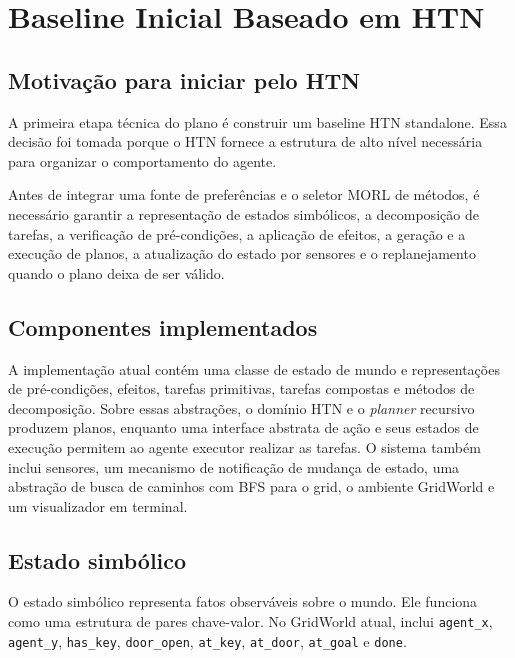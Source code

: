 
\chapter{Baseline Inicial Baseado em HTN}

\section{Motivação para iniciar pelo HTN}

A primeira etapa técnica do plano é construir um baseline HTN standalone. Essa
decisão foi tomada porque o HTN fornece a estrutura de alto nível necessária
para organizar o comportamento do agente.

Antes de integrar uma fonte de preferências e o seletor MORL de métodos, é necessário
garantir a representação de estados simbólicos, a decomposição de tarefas, a
verificação de pré-condições, a aplicação de efeitos, a geração e a execução de
planos, a atualização do estado por sensores e o replanejamento quando o plano
deixa de ser válido.

\section{Componentes implementados}

A implementação atual contém uma classe de estado de mundo e representações de
pré-condições, efeitos, tarefas primitivas, tarefas compostas e métodos de
decomposição. Sobre essas abstrações, o domínio HTN e o \textit{planner} recursivo
produzem planos, enquanto uma interface abstrata de ação e seus estados de
execução permitem ao agente executor realizar as tarefas. O sistema também
inclui sensores, um mecanismo de notificação de mudança de estado, uma abstração
de busca de caminhos com BFS para o grid, o ambiente GridWorld e um
visualizador em terminal.

\section{Estado simbólico}

O estado simbólico representa fatos observáveis sobre o mundo. Ele funciona
como uma estrutura de pares chave-valor. No GridWorld atual, inclui
\texttt{agent\_x}, \texttt{agent\_y}, \texttt{has\_key},
\texttt{door\_open}, \texttt{at\_key}, \texttt{at\_door},
\texttt{at\_goal} e \texttt{done}.

